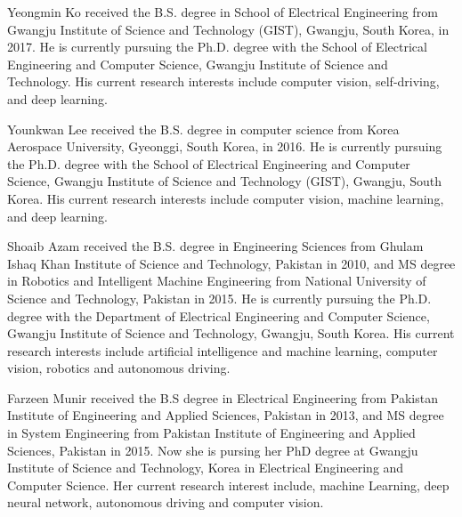 \documentclass[journal]{IEEEtran}
\begin{document}
\ifCLASSOPTIONcaptionsoff
  \newpage
\fi
















    \begin{IEEEbiography}{Yeongmin Ko} received the B.S. degree in School of Electrical Engineering from Gwangju Institute of Science and Technology (GIST), Gwangju, South Korea, in 2017. He is currently pursuing the Ph.D. degree with the School of Electrical Engineering and Computer Science, Gwangju Institute of Science and Technology. His current research interests include computer vision, self-driving, and deep learning.
    \end{IEEEbiography}

    \begin{IEEEbiography}{Younkwan Lee} received the B.S. degree in computer science from Korea Aerospace University, Gyeonggi, South Korea, in 2016. He is currently pursuing the Ph.D. degree with the School of Electrical Engineering and Computer Science, Gwangju Institute of Science and Technology (GIST), Gwangju, South Korea. His current research interests include computer vision, machine learning, and deep learning.
    \end{IEEEbiography}

    \begin{IEEEbiography}{Shoaib Azam} received the B.S. degree in Engineering Sciences from Ghulam Ishaq Khan Institute of Science and Technology, Pakistan in 2010, and MS degree in Robotics and Intelligent Machine Engineering from National University of Science and Technology, Pakistan in 2015. He is currently pursuing the Ph.D. degree with the Department of Electrical Engineering and Computer Science, Gwangju Institute of Science and Technology, Gwangju, South Korea. His current research interests include artificial intelligence and machine learning, computer vision, robotics and autonomous driving.
    \end{IEEEbiography}
    
    \begin{IEEEbiography}{Farzeen Munir} received the B.S degree in Electrical
Engineering from Pakistan Institute of Engineering and Applied Sciences, Pakistan in 2013, and MS degree in System Engineering from Pakistan Institute of Engineering and Applied Sciences, Pakistan in 2015. Now she is pursing her PhD degree at Gwangju Institute of Science and Technology, Korea in Electrical Engineering and Computer Science. Her current research interest include, machine Learning, deep neural network, autonomous driving and computer vision.
    \end{IEEEbiography}
\end{document}
